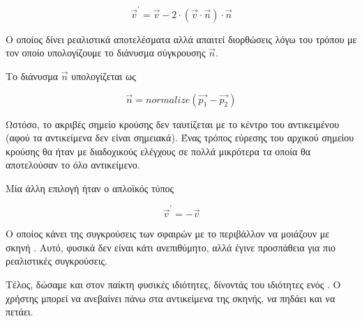 \documentclass[11pt]{scrartcl} %
\begin{document}
\begin{equation}
    \vec{v}^\prime = \vec{v} - 2 \cdot ( \vec{v} \cdot \vec{n} ) \cdot \vec{n}
\end{equation}

Ο οποίος δίνει ρεαλιστικά αποτελέσματα αλλά απαιτεί διορθώσεις λόγω του τρόπου με τον οποίο υπολογίζουμε το διάνυσμα 
σύγκρουσης $\vec{n}$. 

Το διάνυσμα $\vec{n}$ υπολογίζεται ως 

\begin{equation}
    \vec{n} = normalize(\vec{p_1} - \vec{p_2})
\end{equation}

Ωστόσο, το ακριβές σημείο κρούσης δεν ταυτίζεται με το κέντρο του αντικειμένου (αφού τα αντικείμενα δεν είναι σημειακά).
Ένας τρόπος εύρεσης του αρχικού σημείου κρούσης θα ήταν με διαδοχικούς ελέγχους σε πολλά μικρότερα 
 τα οποία θα αποτελούσαν το όλο αντικείμενο.


Μία άλλη επιλογή ήταν ο απλοϊκός τύπος 

\begin{equation}
    \vec{v}^\prime = -\vec{v}
\end{equation}

Ο οποίος κάνει της συγκρούσεις των σφαιρών με το περιβάλλον να μοιάζουν με σκηνή . Αυτό, φυσικά 
δεν είναι κάτι ανεπιθύμητο, αλλά έγινε προσπάθεια για πιο ρεαλιστικές συγκρούσεις.

Τέλος, δώσαμε και στον παίκτη φυσικές ιδιότητες, δίνοντάς του ιδιότητες ενός . 
Ο χρήστης μπορεί να ανεβαίνει πάνω στα αντικείμενα της σκηνής, να πηδάει και να πετάει.

\end{document}
